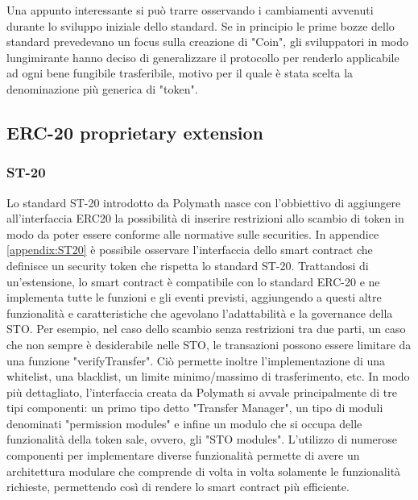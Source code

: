 Una appunto interessante si può trarre osservando i cambiamenti avvenuti durante lo sviluppo iniziale dello standard. Se in principio le prime bozze dello standard prevedevano un focus sulla creazione di "Coin", gli sviluppatori in modo lungimirante hanno deciso di generalizzare il protocollo per renderlo applicabile ad ogni bene fungibile trasferibile, motivo per il quale è stata scelta la denominazione più generica di "token".

\subsection{ERC-20 proprietary extension}
\subsubsection{ST-20}
Lo standard ST-20 introdotto da Polymath nasce con l'obbiettivo di aggiungere all'interfaccia ERC20 la possibilità di inserire restrizioni allo scambio di token in modo da poter essere conforme alle normative sulle securities. 
In appendice \ref{appendix:ST20} è possibile osservare l'interfaccia dello smart contract che definisce un security token che rispetta lo standard ST-20. Trattandosi di un'estensione, lo smart contract è compatibile con lo standard ERC-20 e ne implementa tutte le funzioni e gli eventi previsti, aggiungendo a questi altre funzionalità e caratteristiche che agevolano l'adattabilità e la governance della STO. Per esempio, nel caso dello scambio senza restrizioni tra due parti, un caso che non sempre è desiderabile nelle STO, le transazioni possono essere limitare da una funzione "verifyTransfer". Ciò permette inoltre l'implementazione di una whitelist, una blacklist, un limite minimo/massimo di trasferimento, etc. 
In modo più dettagliato, l'interfaccia creata da Polymath si avvale principalmente di tre tipi componenti: un primo tipo detto "Transfer Manager", un tipo di moduli denominati "permission modules" e infine un modulo che si occupa delle funzionalità della token sale, ovvero, gli "STO modules". 
L'utilizzo di numerose componenti per implementare diverse funzionalità permette di avere un architettura modulare che comprende di volta in volta solamente le funzionalità richieste, permettendo così di rendere lo smart contract più efficiente.

